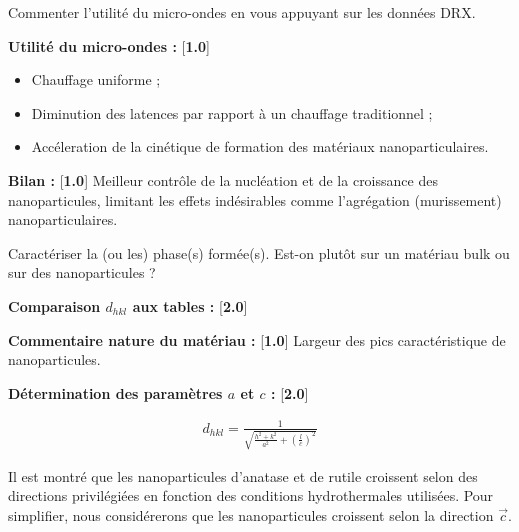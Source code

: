 \documentclass[twoside,a4paper,11pt,addpoints]{exam}%
\newcounter{foo} %
\begin{document}
\begin{questions}

\setcounter{question}{\thefoo}

\question[1] Commenter l'utilité du micro-ondes en vous appuyant sur les données DRX.

\begin{mybox}
\begin{solution}[5cm]

\textbf{Utilité du micro-ondes :} [\textbf{1.0}]
\begin{itemize}
\item Chauffage uniforme ;
\item Diminution des latences par rapport à un chauffage traditionnel ;
\item Accéleration de la cinétique de formation des matériaux nanoparticulaires.
\end{itemize}

\textbf{Bilan :} [\textbf{1.0}] Meilleur contrôle de la nucléation et de la croissance des nanoparticules, limitant les effets indésirables comme l'agrégation (murissement) nanoparticulaires.

\end{solution}
\end{mybox}

\question[5] Caractériser la (ou les) phase(s) formée(s). Est-on plutôt sur un matériau bulk ou sur des nanoparticules ?

\begin{mybox}
\begin{solution}[5cm]

\textbf{Comparaison $d_{hkl}$ aux tables :} [\textbf{2.0}]

\textbf{Commentaire nature du matériau :} [\textbf{1.0}] Largeur des pics caractéristique de nanoparticules.

\textbf{Détermination des paramètres $a$ et $c$ :} [\textbf{2.0}]

\begin{align*}
d_{hkl} = \frac{1}{\sqrt{\frac{h^2 + k^2}{a^2} + \left(\frac{l}{c}\right)^2 }}
\end{align*}

\end{solution}
\end{mybox}

Il est montré que les nanoparticules d'anatase et de rutile croissent selon des directions privilégiées en fonction des conditions hydrothermales utilisées. Pour simplifier, nous considérerons que les nanoparticules croissent selon la direction $\vec{c}$.


\end{questions}
\end{document}
